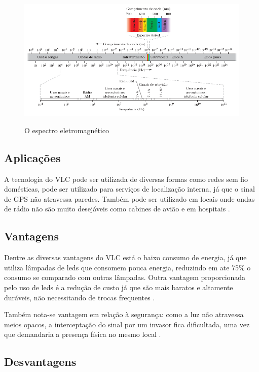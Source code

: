 \begin{figure}[!htbp]
  \caption{O espectro eletromagnético}
  \includegraphics[scale=0.65]{images/espectro_eletromagnetico.png}
  \label{fig:espectro_eletromagnetico}
\end{figure}

\subsection{Aplicações}

A tecnologia do VLC pode ser utilizada de diversas formas como redes sem fio domésticas, pode ser utilizado para serviços de localização interna, já que o sinal de GPS não atravessa paredes. Também pode ser utilizado em locais onde ondas de rádio não são muito desejáveis como cabines de avião e em hospitais \cite{matheus2017comunicaccao}. 

\subsection{Vantagens}

Dentre as diversas vantagens do VLC está o baixo consumo de energia, já que utiliza lâmpadas de leds que consomem pouca energia, reduzindo em ate 75\% o consumo se comparado com outras lâmpadas. Outra vantagem proporcionada pelo uso de leds é a redução de custo já que são mais baratos e altamente duráveis, não necessitando de trocas frequentes \cite{matheus2017comunicaccao}.

Também nota-se vantagem em relação à segurança: como a luz não atravessa meios opacos, a interceptação do sinal por um invasor fica dificultada, uma vez que demandaria a presença física no mesmo local \cite{conceiccao2015comunicaccao}.

\subsection{Desvantagens}

